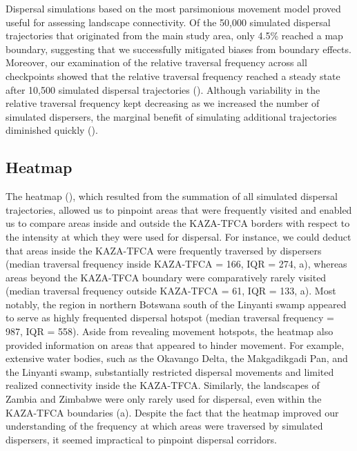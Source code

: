 \documentclass[../FinalThesis.tex]{subfiles}
\begin{document}
Dispersal simulations based on the most parsimonious movement model proved
useful for assessing landscape connectivity. Of the 50,000 simulated dispersal
trajectories that originated from the main study area, only 4.5\% reached a map
boundary, suggesting that we successfully mitigated biases from boundary
effects. Moreover, our examination of the relative traversal frequency across
all checkpoints showed that the relative traversal frequency reached a steady
state after 10,500 simulated dispersal trajectories ().
Although variability in the relative traversal frequency kept decreasing as we
increased the number of simulated dispersers, the marginal benefit of simulating
additional trajectories diminished quickly ().

\subsection{Heatmap}

The heatmap (), which resulted from the summation of all simulated
dispersal trajectories, allowed us to pinpoint areas that were frequently
visited and enabled us to compare areas inside and outside the KAZA-TFCA borders
with respect to the intensity at which they were used for dispersal. For
instance, we could deduct that areas inside the KAZA-TFCA were frequently
traversed by dispersers (median traversal frequency inside KAZA-TFCA = 166, IQR
= 274, a), whereas areas beyond the KAZA-TFCA boundary were
comparatively rarely visited (median traversal frequency outside KAZA-TFCA = 61,
IQR = 133, a). Most notably, the region in northern Botswana
south of the Linyanti swamp appeared to serve as highly frequented dispersal
hotspot (median traversal frequency = 987, IQR = 558). Aside from revealing
movement hotspots, the heatmap also provided information on areas that appeared
to hinder movement. For example, extensive water bodies, such as the Okavango
Delta, the Makgadikgadi Pan, and the Linyanti swamp, substantially restricted
dispersal movements and limited realized connectivity inside the KAZA-TFCA.
Similarly, the landscapes of Zambia and Zimbabwe were only rarely used for
dispersal, even within the KAZA-TFCA boundaries
(a). Despite the fact that the heatmap improved our
understanding of the frequency at which areas were traversed by simulated
dispersers, it seemed impractical to pinpoint dispersal corridors.
\end{document}
